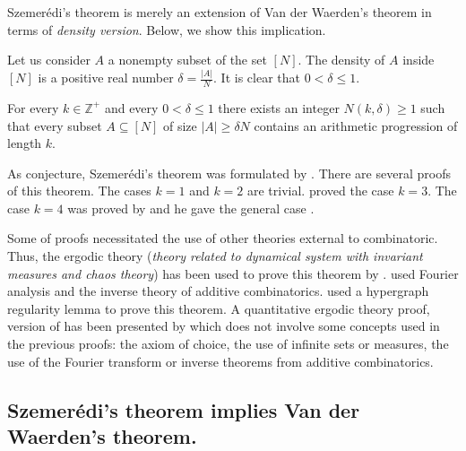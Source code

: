 Szemerédi's theorem is merely an extension of Van der Waerden's theorem in terms of \textit{density version}. Below, we show this implication.

Let us consider $A$ a nonempty subset of the set $[N]$. The density of $A$ inside $[N]$ is a positive real number $\delta=\frac{|A|}{N}$. It is clear that $0< \delta \leq 1.$ 

\begin{thm}\citep{Polymath2009new}	For every  $k \in \mathbb{Z}^+$ and every $0< \delta \leq  1$ there exists an integer $N(k,\delta) \geq 1$ such that every subset $A \subseteq [N]$ of size $|A|\geq \delta N$ contains an arithmetic progression of length $k.$  \label{sz1} \end{thm}

As conjecture, Szemerédi's theorem was formulated by \cite{JLMS}. There are several proofs of this theorem. The cases $k=1$ and $k=2$ are trivial. \cite{roth1953certain, roth1970irregularities} proved the case $k=3.$ The case $k=4$ was proved by \cite{szemeredi1969sets} and he gave the general case \citep{szemeredi1975sets}.

Some of proofs necessitated the use of other theories external to combinatoric. Thus, the ergodic theory (\textit{theory related to dynamical system with invariant measures and chaos theory})  has been used to prove this theorem by \cite{furstenberg1977ergodic, furstenberg1982ergodic}. \cite{gowers1998fourier, gowers2001new}  used Fourier analysis and the inverse theory of additive  combinatorics. \cite{gowers2007hypergraph} used a hypergraph regularity lemma to prove this theorem. A  quantitative ergodic theory proof, version of \cite{furstenberg1982ergodic} has been presented  by \cite{tao2006quantitative} which does not involve some concepts used in the previous proofs: the axiom of choice, the use of infinite sets or measures, the use of the Fourier transform or inverse theorems from additive combinatorics.

\subsection{Szemerédi's theorem implies Van der Waerden's theorem.} \label{vsz}

